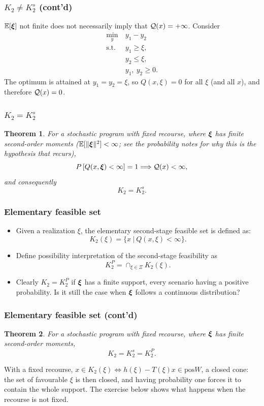 \documentclass[aspectratio=169]{beamer}
\newtheorem{theo}{Theorem}
\begin{document}
\begin{frame}
\frametitle{$K_2 \ne K_2^s$ (cont'd)}

${\mathbb{E}}[{\boldsymbol{\xi}}]$ not finite does not necessarily imply that ${\mathcal{Q}}(x) = +\infty$. Consider
\begin{align*}
\min_y \ & y_1 - y_2 \\
\text{s.t. } & y_1 \geq \xi, \\
& y_2 \leq \xi, \\
& y_1,\ y_2 \geq 0.
\end{align*}
The optimum is attained at $y_1 = y_2 = \xi$, so $Q(x, \xi) = 0$ for all $\xi$ (and all $x$), and therefore ${\mathcal{Q}}(x) = 0$.

\end{frame}

\begin{frame}
\frametitle{$K_2 = K_2^s$}

\begin{theo}
For a stochastic program with fixed recourse, where ${\boldsymbol{\xi}}$ has finite second-order moments (${\mathbb{E}}[\|{\boldsymbol{\xi}}\|^2] < \infty$; see the probability notes for why this is the hypothesis that recurs),
$$
P\left[ Q(x,{\boldsymbol{\xi}}) < \infty \right] = 1 \Longrightarrow \mathcal{Q}(x) < \infty,
$$
and consequently
$$
K_2 = K_2^s.
$$
\end{theo}


\end{frame}

\begin{frame}
\frametitle{Elementary feasible set}

\begin{itemize}
	\item 
Given a realization $\xi$, the {\red elementary second-stage feasible set} is defined as:
\[
K_2(\xi) = \lbrace x \ |\ Q(x,\xi) < \infty \rbrace.
\]
\item
Define {\red possibility interpretation} of the second-stage feasibility as
\[
K_2^P = \cap_{\xi \in \Xi} K_2(\xi).
\]
\item
Clearly $K_2 = K_2^P$ if ${\boldsymbol{\xi}}$ has a finite support, every scenario having a positive probability.
Is it still the case when ${\boldsymbol{\xi}}$ follows a continuous distribution?
\end{itemize}

\end{frame}

\begin{frame}
\frametitle{Elementary feasible set (cont'd)}

\begin{theo}
For a stochastic program with fixed recourse, where ${\boldsymbol{\xi}}$ has finite second-order moments,
$$K_2 = K_2^s = K_2^P.$$
\end{theo}

With a fixed recourse, $x \in K_2(\xi) \iff h(\xi)-T(\xi)x \in \text{pos}W$, a {\red closed} cone: the set of favourable $\xi$ is then closed, and having probability one forces it to contain the whole support.
The exercise below shows what happens when the recourse is not fixed.

\end{frame}
\end{document}
